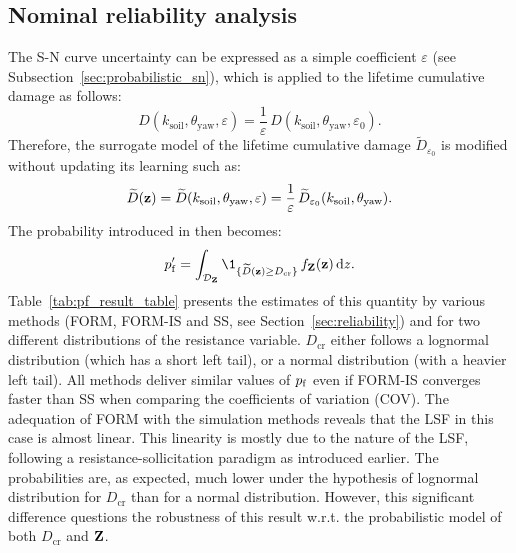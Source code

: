 \subsection{Nominal reliability analysis}\label{sec:owt_ra}
The S-N curve uncertainty can be expressed as a simple coefficient $\varepsilon$ (see Subsection~\ref{sec:probabilistic_sn}), which is applied to the lifetime cumulative damage as follows: 
\begin{equation}
    D(k_{\mathrm{soil}}, \theta_{\mathrm{yaw}}, \varepsilon) = \frac{1}{\varepsilon} \, D(k_{\mathrm{soil}}, \theta_{\mathrm{yaw}}, \varepsilon_0).
\end{equation}
Therefore, the surrogate model of the lifetime cumulative damage $\widetilde{D}_{\varepsilon_0}$ is modified without updating its learning such as:
\begin{equation}
    \widetilde{D}({\bf z}) = \widetilde{D}(k_{\mathrm{soil}}, \theta_{\mathrm{yaw}}, \varepsilon) = \frac1\varepsilon \, \widetilde{D}_{\varepsilon_0}(k_{\mathrm{soil}}, \theta_{\mathrm{yaw}}).
\end{equation} 
The probability introduced in  then becomes: 
\begin{equation}
    \pf' = \int_{\iD_\bZ} \1_{\{\widetilde{D}(\bz) \geq D_{\mathrm{cr}}\}} \, f_\bZ(\bz) \, \dd z.
    \label{eq:owt_pf_surrogate}
\end{equation}
Table~\ref{tab:pf_result_table} presents the estimates of this quantity by various methods (FORM, FORM-IS and SS, see Section~\ref{sec:reliability}) and for two different distributions of the resistance variable. 
$D_{\mathrm{cr}}$ either follows a lognormal distribution (which has a short left tail), or a normal distribution (with a heavier left tail). 
All methods deliver similar values of $p_\mathrm{f}$ even if FORM-IS converges faster than SS when comparing the coefficients of variation (COV). 
The adequation of FORM with the simulation methods reveals that the LSF in this case is almost linear. 
This linearity is mostly due to the nature of the LSF, following a resistance-sollicitation paradigm as introduced earlier. 
The probabilities are, as expected, much lower under the hypothesis of lognormal distribution for $D_{\mathrm{cr}}$ than for a normal distribution. 
However, this significant difference questions the robustness of this result w.r.t. the probabilistic model of both $D_{\mathrm{cr}}$ and ${\bf Z}$.  

